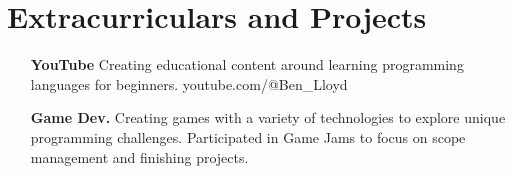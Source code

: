 \documentclass{article}
\begin{document}
\section{Extracurriculars and Projects}
\begin{itemize}
  \item[\bfseries YouTube] Creating educational content around learning programming languages for beginners. youtube.com/@Ben\_Lloyd
  \item[\bfseries Game Dev.] Creating games with a variety of technologies to explore unique programming challenges. Participated in Game Jams to focus on scope management and finishing projects.
\end{itemize}

\thispagestyle{empty}
\end{document}
